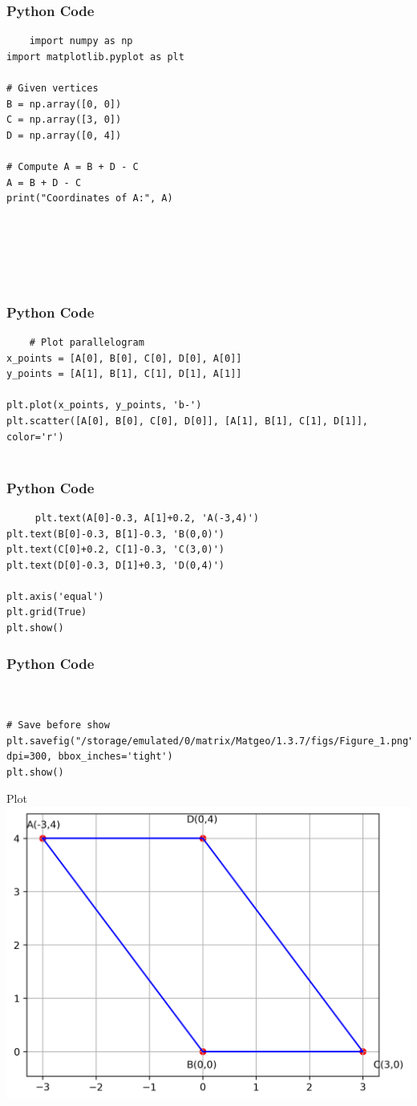 \documentclass{beamer}
\begin{document}
\begin{frame}[fragile]
    \frametitle{Python Code}
    \begin{lstlisting}
    import numpy as np
import matplotlib.pyplot as plt

# Given vertices
B = np.array([0, 0])
C = np.array([3, 0])
D = np.array([0, 4])

# Compute A = B + D - C
A = B + D - C
print("Coordinates of A:", A)






    \end{lstlisting}
\end{frame}

\begin{frame}[fragile]
    \frametitle{Python Code}
    \begin{lstlisting}
    # Plot parallelogram
x_points = [A[0], B[0], C[0], D[0], A[0]]
y_points = [A[1], B[1], C[1], D[1], A[1]]

plt.plot(x_points, y_points, 'b-')
plt.scatter([A[0], B[0], C[0], D[0]], [A[1], B[1], C[1], D[1]], color='r')


    \end{lstlisting}
\end{frame}

\begin{frame}[fragile]
    \frametitle{Python Code}
    \begin{lstlisting}
     plt.text(A[0]-0.3, A[1]+0.2, 'A(-3,4)')
plt.text(B[0]-0.3, B[1]-0.3, 'B(0,0)')
plt.text(C[0]+0.2, C[1]-0.3, 'C(3,0)')
plt.text(D[0]-0.3, D[1]+0.3, 'D(0,4)')

plt.axis('equal')
plt.grid(True)
plt.show()

    \end{lstlisting}
\end{frame}


\begin{frame}[fragile]
    \frametitle{Python Code}
    \begin{lstlisting}


# Save before show
plt.savefig("/storage/emulated/0/matrix/Matgeo/1.3.7/figs/Figure_1.png", dpi=300, bbox_inches='tight')
plt.show()
    \end{lstlisting}
\end{frame}


\begin{frame}{Plot}
    \centering
    \includegraphics[width=\columnwidth, height=0.8\textheight, keepaspectratio]{figs/figure_1.png}     
\end{frame}
\end{document}
